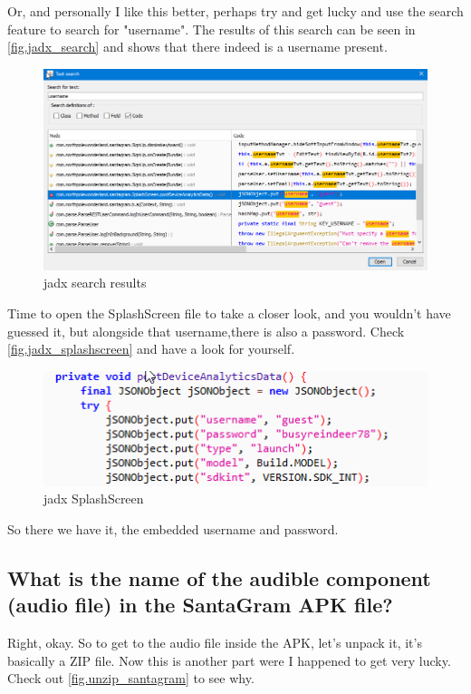 \documentclass[writeup.tex]{subfiles}
\begin{document}
		Or, and personally I like this better, perhaps try and get lucky and use the search feature to search for "username". The results of this search can be seen in \autoref{fig.jadx_search} and shows that there indeed is a username present.
		
		\begin{figure}[H]
			\centering
			\includegraphics[width=\linewidth]{screenshots/jadx_search}
			\caption{jadx search results}
			\label{fig.jadx_search}
		\end{figure}
		
		Time to open the SplashScreen file to take a closer look, and you wouldn't have guessed it, but alongside that username,there is also a password. Check \autoref{fig.jadx_splashscreen} and have a look for yourself.

		\begin{figure}[H]
			\centering
			\includegraphics[scale=1]{screenshots/jadx_splashscreen}
			\caption{jadx SplashScreen}
			\label{fig.jadx_splashscreen}
		\end{figure}
		
		So there we have it, the embedded username and password.
		
	\subsection{What is the name of the audible component (audio file) in the SantaGram APK file?}
		Right, okay. So to get to the audio file inside the APK, let's unpack it, it's basically a ZIP file. Now this is another part were I happened to get very lucky. Check out \autoref{fig.unzip_santagram} to see why.
\end{document}
